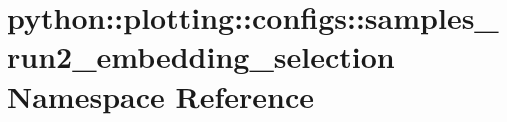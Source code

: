 \hypertarget{namespacepython_1_1plotting_1_1configs_1_1samples__run2__embedding__selection}{
\section{python::plotting::configs::samples\_\-run2\_\-embedding\_\-selection Namespace Reference}
\label{namespacepython_1_1plotting_1_1configs_1_1samples__run2__embedding__selection}
}
